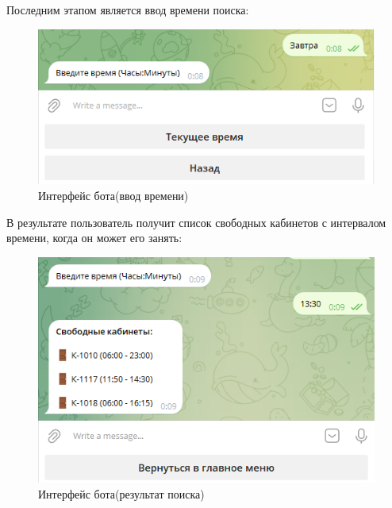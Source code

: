Последним этапом является ввод времени поиска:
\begin{figure}[h]
    \centering
    \includegraphics[scale=0.8]{img/4}
    \caption{Интерфейс бота(ввод времени)}
    \label{fig:cp}
\end{figure}

В результате пользователь получит список свободных кабинетов с
интервалом времени, когда он может его занять:
\begin{figure}[h]
    \centering
    \includegraphics[scale=0.8]{img/5}
    \caption{Интерфейс бота(результат поиска)}
    \label{fig:cp}
\end{figure}

